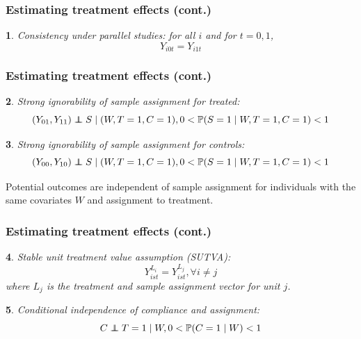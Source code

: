 \documentclass{beamer}
\makeatletter
\newtheorem*{assumption*}{\assumptionnumber}
\providecommand{\assumptionnumber}{}
\newenvironment{assumption}[2]
 {%
  \renewcommand{\assumptionnumber}{Assumption #1}%
  \begin{assumption*}%
  \protected@edef\@currentlabel{#1}%
 }
 {%
  \end{assumption*}
 }
\newcommand{\pr}{\mathbb{P}} %
\newcommand\independent{\protect\mathpalette{\protect\independenT}{\perp}}
\def\independenT#1#2{\mathrel{\rlap{$#1#2$}\mkern2mu{#1#2}}}
\makeatother
\begin{document}
\begin{frame}
\begin{singlespace}
\begin{tiny}


\end{tiny}
\end{singlespace}
\itemize
\end{frame}



\begin{frame}
\frametitle{Estimating treatment effects (cont.)}
\begin{assumption}{1}{}\label{consistency}
Consistency under parallel studies: for all $i$ and for $t=0, 1$,
$$Y_{i0t} = Y_{i1t}$$
\end{assumption}
\end{frame}

\begin{frame}
\frametitle{Estimating treatment effects (cont.)}
\begin{assumption}{2}{}\label{si_treat}
Strong ignorability of sample assignment for treated:
\begin{equation*}
(Y_{01}, Y_{11}) \independent S \mid (W, T=1,C = 1), 0 < \pr(S=1 \mid W, T=1,C = 1) <1 
\end{equation*}
\end{assumption}

\begin{assumption}{3}{}\label{si_ctrl}
Strong ignorability of sample assignment for controls:
\begin{equation*}
(Y_{00}, Y_{10}) \independent S \mid (W, T=1,C = 1), 0 < \pr(S=1 \mid W, T=1,C = 1) <1 
\end{equation*}\end{assumption}

\noindent Potential outcomes are independent of sample assignment for individuals with the same covariates $W$ and assignment to treatment.
\end{frame}

\begin{frame}
\frametitle{Estimating treatment effects (cont.)}
\begin{assumption}{4}{}\label{sutva}
Stable unit treatment value assumption (SUTVA):
\begin{equation*}
Y_{ist}^{L_i} = Y_{ist}^{L_j},  \forall i \neq j
\end{equation*}
where $L_j$ is the treatment and sample assignment vector for unit $j$. \end{assumption}
 
\begin{assumption}{5}{}\label{compl}
Conditional independence of compliance and assignment:
\begin{equation*}
C \independent T=1 \mid W, 0 < \pr(C = 1 \mid W) < 1
\end{equation*}
\end{assumption}
\end{frame}
\end{document}
